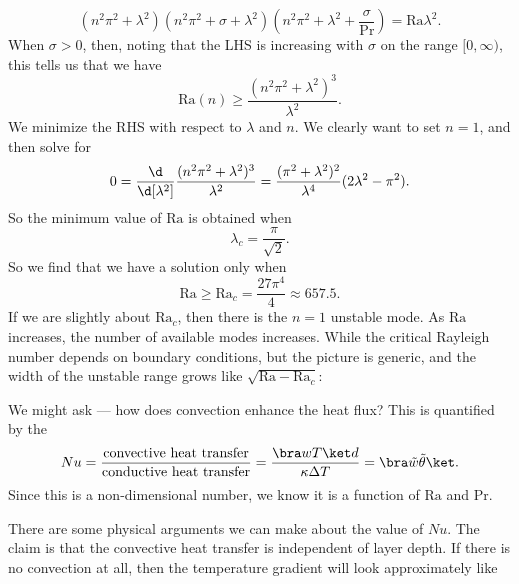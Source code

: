 \documentclass[a4paper]{article}
\newcommand\Ra{\mathrm{Ra}}
\renewcommand\Pr{\mathrm{Pr}}
\begin{document}
\[
  (n^2 \pi^2 + \lambda^2) (n^2 \pi^2 + \sigma + \lambda^2) \left(n^2\pi^2 + \lambda^2 + \frac{\sigma}{\Pr}\right) = \Ra \lambda^2.
\]
When $\sigma > 0$, then, noting that the LHS is increasing with $\sigma$ on the range $[0, \infty)$, this tells us that we have
\[
  \Ra(n) \geq \frac{(n^2 \pi^2 + \lambda^2)^3}{\lambda^2}.
\]
We minimize the RHS with respect to $\lambda$ and $n$. We clearly want to set $n = 1$, and then solve for
\[
  0 = \frac{\d}{\d [\lambda^2]} \frac{(n^2 \pi^2 + \lambda^2)^3}{\lambda^2} = \frac{(\pi^2 + \lambda^2)^2}{\lambda^4}(2\lambda^2 - \pi^2).
\]
So the minimum value of $\Ra$ is obtained when
\[
  \lambda_c = \frac{\pi}{\sqrt{2}}.
\]
So we find that we have a solution only when
\[
  \Ra \geq \Ra_c = \frac{27\pi^4}{4} \approx 657.5.
\]
If we are slightly about $\Ra_c$, then there is the $n = 1$ unstable mode. As $\Ra$ increases, the number of available modes increases. While the critical Rayleigh number depends on boundary conditions, but the picture is generic, and the width of the unstable range grows like $\sqrt{\Ra - \Ra_c}$:
\begin{center}
\end{center}

We might ask --- how does convection enhance the heat flux? This is quantified by the 
\[
  Nu = \frac{\text{convective heat transfer}}{\text{conductive heat transfer}} = \frac{\bra wT\ket d}{\kappa \Delta T} = \bra \tilde{w} \tilde{\theta}\ket.
\]
Since this is a non-dimensional number, we know it is a function of $\Ra$ and $\Pr$.

There are some physical arguments we can make about the value of $Nu$. The claim is that the convective heat transfer is independent of layer depth. If there is no convection at all, then the temperature gradient will look approximately like
\end{document}
